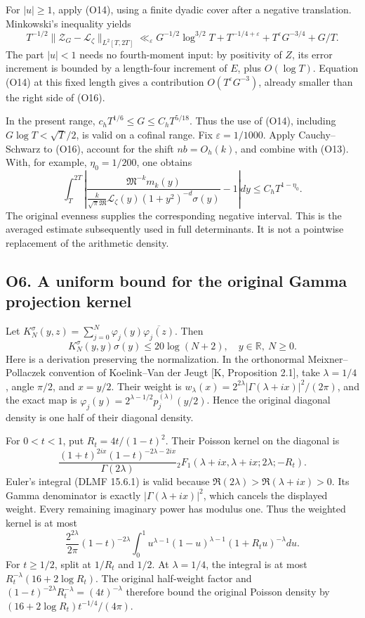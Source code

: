 For \(|u|\ge1\), apply (O14), using a finite dyadic cover after a
negative translation. Minkowski's inequality yields \[
\boxed{T^{-1/2}\|\mathcal Z_G-\mathcal L_\zeta\|_{L^2[T,2T]}
\ll_\varepsilon
G^{-1/2}\log^{3/2}T+T^{-1/4+\varepsilon}
+T^\varepsilon G^{-3/4}+G/T.}\tag{O16}
\] The part \(|u|<1\) needs no fourth-moment input: by positivity of
\(Z\), its error increment is bounded by a length-four increment of
\(E\), plus \(O(\log T)\). Equation (O14) at this fixed length gives a
contribution \(O(T^\varepsilon G^{-3})\), already smaller than the right
side of (O16).

In the present range, \(c_hT^{1/6}\le G\le C_hT^{5/18}\). Thus the use
of (O14), including \(G\log T<\sqrt T/2\), is valid on a cofinal range.
Fix \(\varepsilon=1/1000\). Apply Cauchy--Schwarz to (O16), account for
the shift \(nb=O_h(k)\), and combine with (O13). With, for example,
\(\eta_0=1/200\), one obtains \[
\boxed{\int_T^{2T}
\left|\frac{\mathfrak M^{-k}m_k(y)}
{\frac{k}{\sqrt\pi\mathfrak M}\mathcal L_\zeta(y)
(1+y^2)^{-d}\sigma(y)}-1\right|dy
\le C_hT^{1-\eta_0}.}\tag{O17}
\] The original evenness supplies the corresponding negative interval.
This is the averaged estimate subsequently used in full determinants. It
is not a pointwise replacement of the arithmetic density.

\subsection{O6. A uniform bound for the original Gamma projection
kernel}\label{sa:o6.-a-uniform-bound-for-the-original-gamma-projection-kernel}

Let \(K_N^\sigma(y,z)=\sum_{j=0}^N\varphi_j(y)\overline{\varphi_j(z)}\).
Then \[
\boxed{K_N^\sigma(y,y)\sigma(y)\le20\log(N+2),
\quad y\in\mathbb R,\ N\ge0.}\tag{O18}
\] Here is a derivation preserving the normalization. In the orthonormal
Meixner--Pollaczek convention of Koelink--Van der Jeugt {[}K,
Proposition 2.1{]}, take \(\lambda=1/4\), angle \(\pi/2\), and
\(x=y/2\). Their weight is
\(w_\lambda(x)=2^{2\lambda}|\Gamma(\lambda+ix)|^2/(2\pi)\), and the
exact map is \(\varphi_j(y)=2^{\lambda-1/2}p_j^{(\lambda)}(y/2)\). Hence
the original diagonal density is one half of their diagonal density.

For \(0<t<1\), put \(R_t=4t/(1-t)^2\). Their Poisson kernel on the
diagonal is \[
\frac{(1+t)^{2ix}(1-t)^{-2\lambda-2ix}}{\Gamma(2\lambda)}
{}_2F_1(\lambda+ix,\lambda+ix;2\lambda;-R_t).
\] Euler's integral (DLMF 15.6.1) is valid because
\(\Re(2\lambda)>\Re(\lambda+ix)>0\). Its Gamma denominator is exactly
\(|\Gamma(\lambda+ix)|^2\), which cancels the displayed weight. Every
remaining imaginary power has modulus one. Thus the weighted kernel is
at most \[
\frac{2^{2\lambda}}{2\pi}(1-t)^{-2\lambda}
\int_0^1u^{\lambda-1}(1-u)^{\lambda-1}(1+R_tu)^{-\lambda}du.
\] For \(t\ge1/2\), split at \(1/R_t\) and \(1/2\). At \(\lambda=1/4\),
the integral is at most \(R_t^{-\lambda}(16+2\log R_t)\). The original
half-weight factor and
\((1-t)^{-2\lambda}R_t^{-\lambda}=(4t)^{-\lambda}\) therefore bound the
original Poisson density by \((16+2\log R_t)t^{-1/4}/(4\pi)\).

